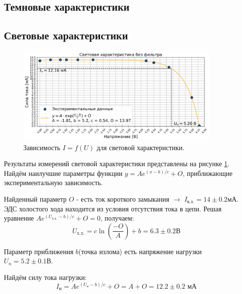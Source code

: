 \documentclass[a4paper, 12pt]{extarticle}
\begin{document}
\subsection*{\textcolor{sub_header}{Темновые характеристики}}



\subsection*{\textcolor{sub_header}{Световые характеристики}}




\begin{figure}[!hbtp]
    \centering
    \includegraphics[width = 0.9\textwidth]{pics/no_filter.png}
    \caption{Зависимость $I = f(U)$ для световой характеристики.}
    \label{fig:light_straight}
\end{figure}

Результаты измерений световой характеристики представлены на рисунке \ref{fig:light_straight}. Найдём наилучшие параметры функции $y = A e^{(x - b) / c} + O$, приближающие экспериментальную зависимость. 


Найденный параметр $O$ - есть ток короткого замыкания $\to$ $I_{\text{к.з.}} = 14 \pm 0.2 \text{мА}$. 
ЭДС холостого хода находится из условия отсутствия тока в цепи. Решая уравнение $A e^{(U_{\text{x.x.}} - b) / c} + O = 0$, получаем:
\begin{equation}
    U_{\text{x.x.}} = c \operatorname{ln}(\frac{-O}{A}) + b = 6.3 \pm 0.2 \text{В}
    \label{uxx}
\end{equation}

Параметр приближения $b$(точка излома) есть напряжение нагрузки $U_n = 5.2 \pm 0.1 \text{В}$.

Найдём силу тока нагрузки:
\begin{equation}
    I_{\text{н}} = A e^{(U_{\text{н}} - b) / c} + O = A + O =  12.2 \pm 0.2 \text{ мА}
    \label{in}
\end{equation}
\end{document}
